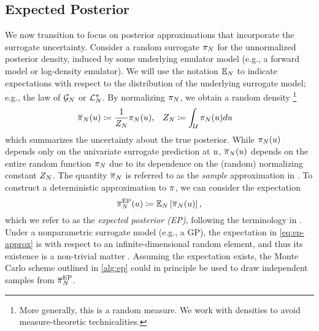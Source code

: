 \documentclass[12pt]{article}
\begin{document}
\subsection{Expected Posterior}
We now transition to focus on posterior approximations that incorporate the surrogate uncertainty.
Consider a random surrogate $\postEm[\Ndesign]$ for the unnormalized posterior density, 
induced by some underlying emulator model (e.g., a forward model or log-density emulator).
We will use the notation $\E_{\Ndesign}$ to indicate expectations with respect to the 
distribution of the underlying surrogate model; e.g., the law of $\fwdEm[\Ndesign]$ or $\lpostEm[\Ndesign]$.
By normalizing $\postEm[\Ndesign]$, we obtain a random density
\footnote{More generally, this is a random measure. We work with densities to avoid measure-theoretic technicalities.}
\begin{align}
&\postNormEm[\Ndesign](\Par) 
\Def \frac{1}{\llikEmRdm[\Ndesign]{\normCst}} \postEm[\Ndesign](\Par),
&&\normCstEm[\Ndesign]\Def \int_{\parSpace} \postEm[\Ndesign](\Par) d\Par
\label{eq:sample-approx}
\end{align}
which summarizes the uncertainty about the true posterior. 
While $\postEm[\Ndesign](\Par)$ depends 
only on the univariate surrogate prediction at $\Par$, $\llikEmRdm[\Ndesign]{\postDensNorm}(\Par)$
depends on the entire random function $\llikEmRdmDens[\Ndesign]$ due to its dependence on 
the (random) normalizing constant $\llikEmRdm[\Ndesign]{\normCst}$. The quantity
$\llikEmRdm[\Ndesign]{\postDensNorm}$ is referred to as the \textit{sample} approximation in
\citet{StuartTeck1, StuartTeck2,random_fwd_models,TeckHyperpar}.
To construct a deterministic approximation to $\postDens$, we can consider the expectation
\begin{equation}
\postApproxEP[\Ndesign](\Par) \Def \E_{\Ndesign}\left[\postNormEm[\Ndesign](\Par) \right], \label{eq:ep-approx}
\end{equation}
which we refer to as the \textit{expected posterior (EP)}, following the terminology in \citet{BurknerSurrogate}.
Under a nonparametric surrogate model (e.g., a GP), the expectation in \cref{eq:ep-approx} is with 
respect to an infinite-dimensional random element, and thus its existence is a non-trivial matter \citep{StuartTeck1}.
Assuming the expectation exists, the Monte Carlo scheme outlined in \cref{alg:ep} could in principle 
be used to draw independent samples from $\llikEmSampDensNorm$. 
\end{document}
